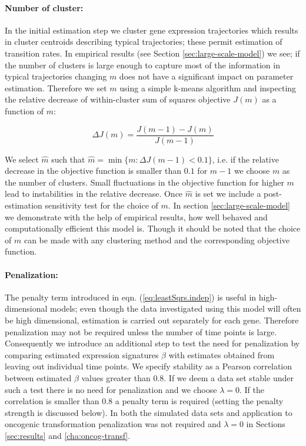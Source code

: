 \paragraph{Number of cluster:}
\label{sec:number-cluster}

In the initial estimation step we cluster gene expression trajectories which results in cluster centroids describing typical trajectories; these permit estimation of transition rates. In empirical results (see Section \ref{sec:large-scale-model}) we see; if the number of clusters is large enough to capture most of the information in typical trajectories changing $m$ does not have a significant impact on parameter estimation. Therefore we set $m$ using a simple k-means algorithm and inspecting the relative decrease of within-cluster sum of squares objective $J(m)$ as a function of $m$:

\[
\Delta J(m) = \frac{J(m-1) - J(m)}{J(m - 1)}
\]

We select $\hat{m}$  such that $\hat{m} = \min \lbrace m : \Delta J(m-1) < 0.1 \rbrace$, i.e. if the relative decrease in the objective function is smaller than $0.1$ for $m-1$ we choose $m$ as the number of clusters. Small fluctuations in the objective function for higher $m$ lead to instabilities in the relative decrease. Once $\hat{m}$ is set we include a post-estimation sensitivity test for the choice of $m$. In section \ref{sec:large-scale-model} we demonstrate with the help of empirical results, how well behaved and computationally efficient this model is. Though it should be noted that the choice of $m$ can be made with any clustering method and the corresponding objective function.

\paragraph{Penalization:}
\label{sec:penalization}

The penalty term introduced in eqn. (\ref{eq:leastSqrs.indep}) is useful in high-dimensional models; even though the data investigated using this model will often be high dimensional, estimation is carried out separately for each gene. Therefore penalization may not be required unless the number of time points is large. Consequently we introduce an additional step to test the need for penalization by comparing estimated expression signatures $\beta$ with estimates obtained from leaving out individual time points. We specify stability as a Pearson correlation between estimated $\beta$ values  greater than $0.8$. If we deem a data set stable under such a test there is no need for penalization and we choose $\lambda=0$. If the correlation is smaller than $0.8$ a penalty term is required (setting the penalty strength is discussed below). In both the simulated data sets and application to oncogenic transformation penalization was not required and $\lambda=0$ in Sections \ref{sec:results} and \ref{cha:oncog-transf}. 

